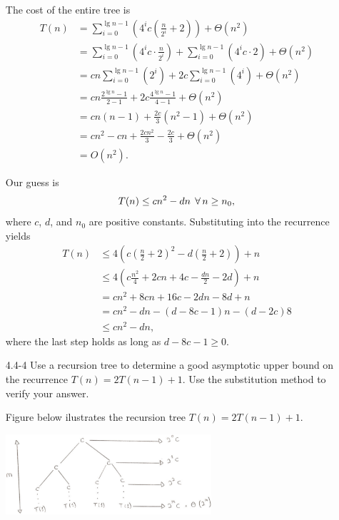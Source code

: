 \begin{enumerate}
\begin{framed}
The cost of the entire tree is
\begin{equation*}
\begin{aligned}
T(n) &= \sum_{i = 0}^{\lg n - 1} \left(4^i c \left(\frac{n}{2^i} + 2\right)\right) +
        \Theta(n^2)\\
     &= \sum_{i = 0}^{\lg n - 1} \left(4^i c \cdot \frac{n}{2^i}\right) +
        \sum_{i = 0}^{\lg n - 1} (4^i c \cdot 2) + \Theta(n^2)\\
     &= cn \sum_{i = 0}^{\lg n - 1} (2^i) + 2c \sum_{i = 0}^{\lg n - 1} (4^i) + \Theta(n^2)\\
     &= cn \frac{2^{\lg n} - 1}{2 - 1} + 2c \frac{4^{\lg n} - 1}{4 - 1} + \Theta(n^2)\\
     &= cn (n - 1) + \frac{2c}{3} (n^2 - 1) + \Theta(n^2)\\
     &= cn^2 - cn + \frac{2cn^2}{3} - \frac{2c}{3} + \Theta(n^2)\\
     &= O(n^2).
\end{aligned}
\end{equation*}

Our guess is
\[
T(n) \le c n^2 - dn \; \operatorname{\forall} n \ge n_0,
\]
where $c$, $d$, and $n_0$ are positive constants. Substituting into the
recurrence yields
\begin{equation*}
\begin{aligned}
  T(n) &\le 4 \left(c \left(\frac{n}{2} + 2\right)^2 - d\left(\frac{n}{2} + 2\right)\right) + n\\
       &\le 4 \left(c \frac{n^2}{4} + 2cn + 4c - \frac{dn}{2} - 2d\right) + n\\
       &= c n^2 + 8cn + 16c - 2dn - 8d + n\\
       &= c n^2 - dn - (d - 8c - 1)n - (d - 2c)8\\
       &\le c n^2 - dn,
\end{aligned}
\end{equation*}
where the last step holds as long as $d - 8c - 1 \ge 0$.
\end{framed}

\newpage

\item[4.4{-}4]{Use a recursion tree to determine a good asymptotic upper bound
on the recurrence $T(n) = 2T(n - 1) + 1$. Use the substitution method to verify
your answer.}

\begin{framed}
Figure below ilustrates the recursion tree $T(n) = 2T(n - 1) + 1$.

\begin{center}
\includegraphics[width=0.6\textwidth]{images/4_4_4_1.pdf}
\end{center}


\end{framed}
\end{enumerate}
